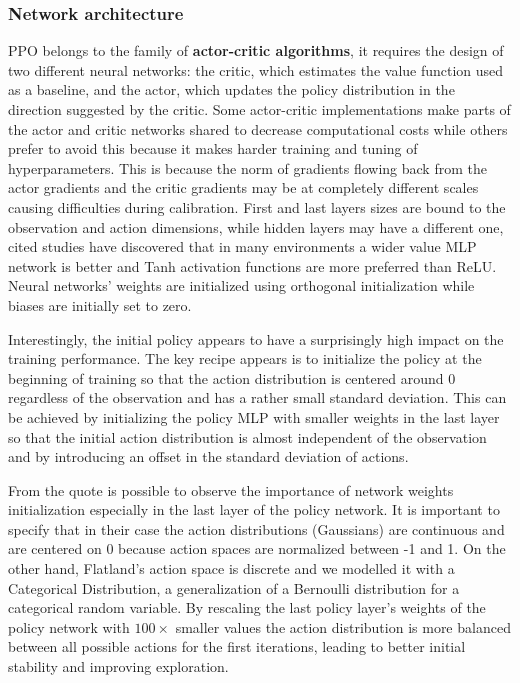 \documentclass[11pt, a4paper, hidelinks]{report}
\begin{document}
\subsubsection{Network architecture}

PPO belongs to the family of \textbf{actor-critic algorithms}, it requires the design of two different neural networks: the critic, which estimates the value function used as a baseline, and the actor, which updates the policy distribution in the direction suggested by the critic.
Some actor-critic implementations make parts of the actor and critic networks shared to decrease computational costs while others prefer to avoid this because it makes harder training and tuning of hyperparameters.
This is because the norm of gradients flowing back from the actor gradients and the critic gradients may be at completely different scales causing difficulties during calibration.
First and last layers sizes are bound to the observation and action dimensions, while hidden layers may have a different one, cited studies have discovered that in many environments a wider value MLP network is better and Tanh activation functions are more preferred than ReLU\@.
Neural networks' weights are initialized using orthogonal initialization while biases are initially set to zero.

\begin{quoting}[font=itshape, begintext={"}, endtext={"\citep{ppo_implementation_2}}]
Interestingly, the initial policy appears to have a surprisingly high impact on the training performance.
The key recipe appears is to initialize the policy at the beginning of training so that the action distribution is centered around 0 regardless of the observation and has a rather small standard deviation.
This can be achieved by initializing the policy MLP with smaller weights in the last layer so that the initial action distribution is almost independent of the observation and by introducing an offset in the standard deviation of actions.
\end{quoting}

From the quote is possible to observe the importance of network weights initialization especially in the last layer of the policy network.
It is important to specify that in their case the action distributions (Gaussians) are continuous and are centered on 0 because action spaces are normalized between -1 and 1.
On the other hand, Flatland's action space is discrete and we modelled it with a Categorical Distribution, a generalization of a Bernoulli distribution for a categorical random variable.
By rescaling the last policy layer's weights of the policy network with $100\times$ smaller values the action distribution is more balanced between all possible actions for the first iterations, leading to better initial stability and improving exploration.
\end{document}

